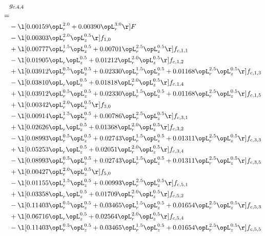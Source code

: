 \begin{alignat}{2} 
\label{eq:g_44_0} 
& g_{c,4,4} \nonumber \\ 
 = \\ 
& - \l[  0.00159 \opL_r^{2.0} +  0.00390 \opL_r^{3.0}  \r] F \nonumber \\ 
& - \l[  0.00303 \opL_r^{2.0} \opL_z^{0.5}  \r] f_{1,0} \nonumber \\ 
& + \l[  0.00777 \opL_r^{1.5} \opL_z^{0.5} +  0.00701 \opL_r^{2.5} \opL_z^{0.5}  \r] f_{c,1,1} \nonumber \\ 
& - \l[  0.01905 \opL_r \opL_z^{0.5} +  0.01212 \opL_r^{2.0} \opL_z^{0.5}  \r] f_{c,1,2} \nonumber \\ 
& + \l[  0.03912 \opL_r^{0.5} \opL_z^{0.5} +  0.02330 \opL_r^{1.5} \opL_z^{0.5} +  0.01168 \opL_r^{2.5} \opL_z^{0.5}  \r] f_{c,1,3} \nonumber \\ 
& - \l[  0.03810 \opL_r \opL_z^{0.5} +  0.01818 \opL_r^{2.0} \opL_z^{0.5}  \r] f_{c,1,4} \nonumber \\ 
& + \l[  0.03912 \opL_r^{0.5} \opL_z^{0.5} +  0.02330 \opL_r^{1.5} \opL_z^{0.5} +  0.01168 \opL_r^{2.5} \opL_z^{0.5}  \r] f_{c,1,5} \nonumber \\ 
& + \l[  0.00342 \opL_r^{2.0} \opL_z^{0.5}  \r] f_{3,0} \nonumber \\ 
& - \l[  0.00914 \opL_r^{1.5} \opL_z^{0.5} +  0.00786 \opL_r^{2.5} \opL_z^{0.5}  \r] f_{c,3,1} \nonumber \\ 
& + \l[  0.02626 \opL_r \opL_z^{0.5} +  0.01368 \opL_r^{2.0} \opL_z^{0.5}  \r] f_{c,3,2} \nonumber \\ 
& - \l[  0.08993 \opL_r^{0.5} \opL_z^{0.5} +  0.02743 \opL_r^{1.5} \opL_z^{0.5} +  0.01311 \opL_r^{2.5} \opL_z^{0.5}  \r] f_{c,3,3} \nonumber \\ 
& + \l[  0.05253 \opL_r \opL_z^{0.5} +  0.02051 \opL_r^{2.0} \opL_z^{0.5}  \r] f_{c,3,4} \nonumber \\ 
& - \l[  0.08993 \opL_r^{0.5} \opL_z^{0.5} +  0.02743 \opL_r^{1.5} \opL_z^{0.5} +  0.01311 \opL_r^{2.5} \opL_z^{0.5}  \r] f_{c,3,5} \nonumber \\ 
& + \l[  0.00427 \opL_r^{2.0} \opL_z^{0.5}  \r] f_{5,0} \nonumber \\ 
& - \l[  0.01155 \opL_r^{1.5} \opL_z^{0.5} +  0.00993 \opL_r^{2.5} \opL_z^{0.5}  \r] f_{c,5,1} \nonumber \\ 
& + \l[  0.03358 \opL_r \opL_z^{0.5} +  0.01709 \opL_r^{2.0} \opL_z^{0.5}  \r] f_{c,5,2} \nonumber \\ 
& - \l[  0.11403 \opL_r^{0.5} \opL_z^{0.5} +  0.03465 \opL_r^{1.5} \opL_z^{0.5} +  0.01654 \opL_r^{2.5} \opL_z^{0.5}  \r] f_{c,5,3} \nonumber \\ 
& + \l[  0.06716 \opL_r \opL_z^{0.5} +  0.02564 \opL_r^{2.0} \opL_z^{0.5}  \r] f_{c,5,4} \nonumber \\ 
& - \l[  0.11403 \opL_r^{0.5} \opL_z^{0.5} +  0.03465 \opL_r^{1.5} \opL_z^{0.5} +  0.01654 \opL_r^{2.5} \opL_z^{0.5}  \r] f_{c,5,5} \nonumber \\ 
\end{alignat} 


